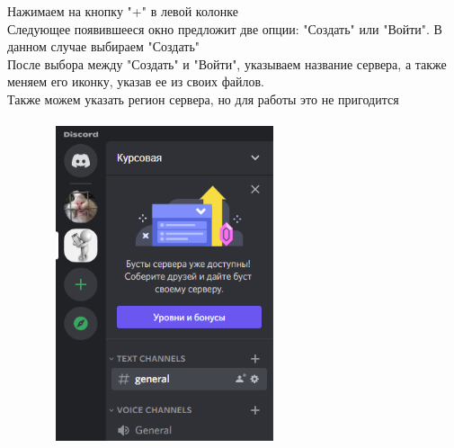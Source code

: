 \documentclass[a4paper,12pt]{article}
\begin{document}
Нажимаем на кнопку "+" в левой колонке \\
Следующее появившееся окно предложит две опции: "Создать" или "Войти". В данном случае выбираем "Создать" \\
После выбора между "Создать" и "Войти", указываем название сервера, а также меняем его иконку, указав ее из своих файлов. \\
Также можем указать регион сервера, но для работы это не пригодится
\\
\\
\includegraphics[width = 350px, height=350px]{pictures/Server.png}

\newpage
\end{document}
